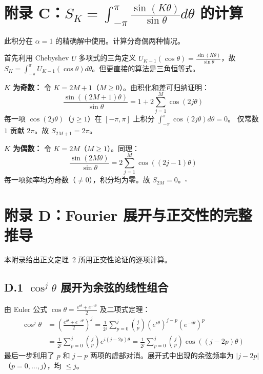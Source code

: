 \documentclass[12pt,a4paper]{ctexart}
\begin{document}
\section{附录 C：$S_K=\int_{-\pi}^{\pi}\frac{\sin(K\theta)}{\sin\theta}d\theta$ 的计算}
\label{app:SK}

此积分在 $\alpha=1$ 的精确解中使用。计算分奇偶两种情况。

首先利用 Chebyshev $U$ 多项式的三角定义 $U_{K-1}(\cos\theta)=\frac{\sin(K\theta)}{\sin\theta}$，故
$S_K=\int_{-\pi}^{\pi}U_{K-1}(\cos\theta)d\theta$。但更直接的算法是三角恒等式。

\textbf{$K$ 为奇数：} 令 $K=2M+1$（$M\geq0$）。由积化和差可归纳证明：
\begin{equation}
\frac{\sin((2M+1)\theta)}{\sin\theta}=1+2\sum_{j=1}^{M}\cos(2j\theta)
\end{equation}
每一项 $\cos(2j\theta)$（$j\geq1$）在 $[-\pi,\pi]$ 上积分 $\int_{-\pi}^{\pi}\cos(2j\theta)d\theta=0$。
仅常数 $1$ 贡献 $2\pi$。故 $S_{2M+1}=2\pi$。

\textbf{$K$ 为偶数：} 令 $K=2M$（$M\geq1$）。同理：
\begin{equation}
\frac{\sin(2M\theta)}{\sin\theta}=2\sum_{j=1}^{M}\cos((2j-1)\theta)
\end{equation}
每一项频率均为奇数（$\neq0$），积分均为零。故 $S_{2M}=0$。$\square$

\section{附录 D：Fourier 展开与正交性的完整推导}
\label{app:fourier}

本附录给出正文定理~2 所用正交性论证的逐项计算。

\subsection*{D.1 $\cos^j\theta$ 展开为余弦的线性组合}

由 Euler 公式 $\cos\theta=\frac{e^{i\theta}+e^{-i\theta}}{2}$ 及二项式定理：
\begin{equation}
\begin{aligned}
\cos^j\theta
&=\left(\frac{e^{i\theta}+e^{-i\theta}}{2}\right)^j
 =\frac{1}{2^j}\sum_{p=0}^{j}\binom{j}{p}(e^{i\theta})^{j-p}(e^{-i\theta})^p \\[4pt]
&=\frac{1}{2^j}\sum_{p=0}^{j}\binom{j}{p}e^{i(j-2p)\theta}
 =\frac{1}{2^j}\sum_{p=0}^{j}\binom{j}{p}\cos((j-2p)\theta)
\end{aligned}
\end{equation}
最后一步利用了 $p$ 和 $j-p$ 两项的虚部对消。展开式中出现的余弦频率为 $|j-2p|$（$p=0,\dots,j$），均 $\leq j$。
\end{document}

